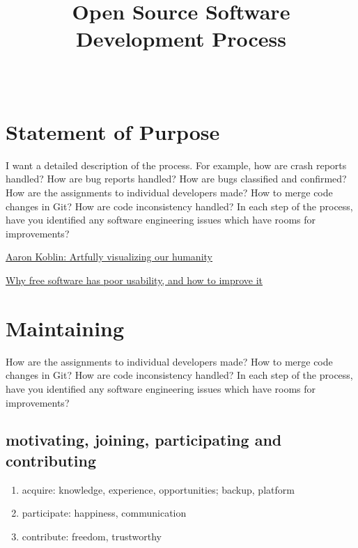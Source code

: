 \documentclass[draftclsnofoot,journal,onecolumn,12pt]{IEEEtran}
\begin{document}
\title{Open Source Software Development Process}

\author{ \\
}

\maketitle
%


\section{Statement of Purpose}
I want a detailed description of the process. For example, how are crash reports handled? How are bug reports handled? How are bugs classified and confirmed? How are the assignments to individual developers made? How to merge code changes in Git? How are code inconsistency handled? In each step of the process, have you identified any software engineering issues which have rooms for improvements?

\href{http://www.ted.com/talks/aaron_koblin.html}{Aaron Koblin: Artfully visualizing our humanity}

\href{http://www.mpt.net.nz/2012/06/why-free-software-has-poor-usability/}{Why free software has poor usability, and how to improve it}

\section{Maintaining}

How are the assignments to individual developers made? How to merge code changes in Git? How are code inconsistency handled? In each step of the process, have you identified any software engineering issues which have rooms for improvements?

\subsection{motivating, joining, participating and contributing}

\begin{enumerate}
  \item acquire: knowledge, experience, opportunities; backup, platform
  \item participate: happiness, communication
  \item contribute: freedom, trustworthy
\end{enumerate}
\end{document}
